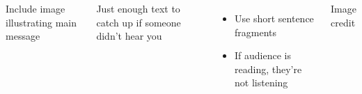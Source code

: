 \documentclass[smaller,aspectratio=149]{beamer}
\begin{document}


\begin{frame}{}
	\begin{columns}[T]
		\bigskip\bigskip
		Include image illustrating main message\par
		\bigskip Just enough text to catch up if someone didn't hear you
		\begin{itemize}\setlength\itemsep{0pt}
			\item Use short sentence fragments
			\item If audience is reading, they're not listening
		\end{itemize}
		\begin{centering}%
			\par%
		\raggedleft\tiny{Image credit}\par
		\end{centering}	
	\end{columns}
\end{frame}
\end{document}
